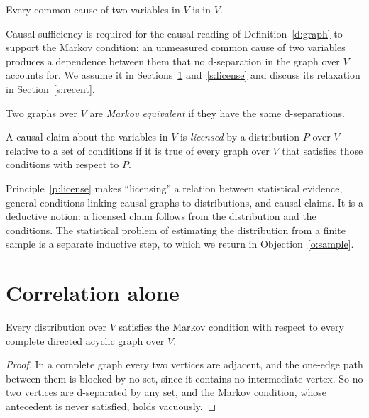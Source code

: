 \documentclass{situationist-preprint}
\begin{document}
\begin{assumption}\label{a:suff}
Every common cause of two variables in $V$ is in $V$.
\end{assumption}

Causal sufficiency is required for the causal reading of Definition~\ref{d:graph} to support the Markov condition: an unmeasured common cause of two variables produces a dependence between them that no d-separation in the graph over $V$ accounts for. We assume it in Sections~\ref{s:alone} and~\ref{s:license} and discuss its relaxation in Section~\ref{s:recent}.

\begin{definition}\label{d:equiv}
Two graphs over $V$ are \emph{Markov equivalent} if they have the same d-separations.
\end{definition}

\begin{principle}[Licensing]\label{p:license}
A causal claim about the variables in $V$ is \emph{licensed} by a distribution $P$ over $V$ relative to a set of conditions if it is true of every graph over $V$ that satisfies those conditions with respect to $P$.
\end{principle}

Principle~\ref{p:license} makes \enquote{licensing} a relation between statistical evidence, general conditions linking causal graphs to distributions, and causal claims. It is a deductive notion: a licensed claim follows from the distribution and the conditions. The statistical problem of estimating the distribution from a finite sample is a separate inductive step, to which we return in Objection~\ref{o:sample}.

\section{Correlation alone}\label{s:alone}

\begin{proposition}\label{p:complete}
Every distribution over $V$ satisfies the Markov condition with respect to every complete directed acyclic graph over $V$.
\end{proposition}

\begin{proof}
In a complete graph every two vertices are adjacent, and the one-edge path between them is blocked by no set, since it contains no intermediate vertex. So no two vertices are d-separated by any set, and the Markov condition, whose antecedent is never satisfied, holds vacuously.
\end{proof}
\end{document}
